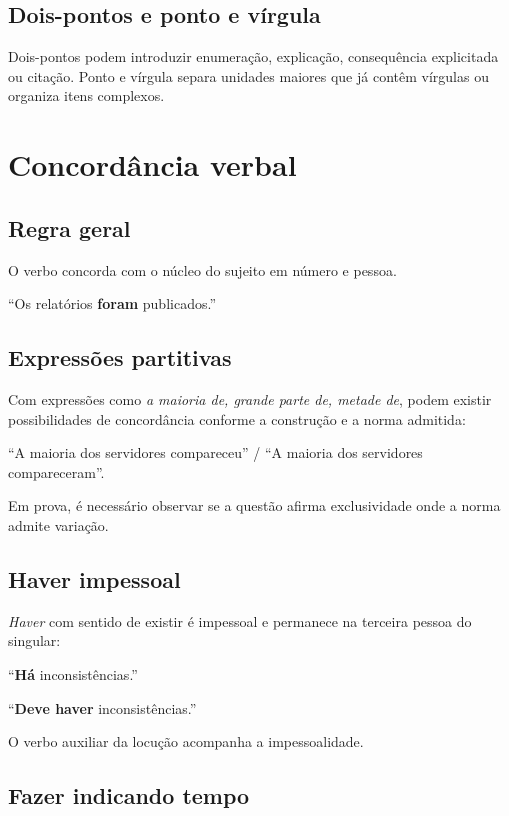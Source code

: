 \subsection{Dois-pontos e ponto e vírgula}

Dois-pontos podem introduzir enumeração, explicação, consequência explicitada ou citação. Ponto e vírgula separa unidades maiores que já contêm vírgulas ou organiza itens complexos.

\section{Concordância verbal}

\subsection{Regra geral}

O verbo concorda com o núcleo do sujeito em número e pessoa.

``Os relatórios \textbf{foram} publicados.''

\subsection{Expressões partitivas}

Com expressões como \emph{a maioria de, grande parte de, metade de}, podem existir possibilidades de concordância conforme a construção e a norma admitida:

``A maioria dos servidores compareceu'' / ``A maioria dos servidores compareceram''.

Em prova, é necessário observar se a questão afirma exclusividade onde a norma admite variação.

\subsection{Haver impessoal}

\emph{Haver} com sentido de existir é impessoal e permanece na terceira pessoa do singular:

``\textbf{Há} inconsistências.''

``\textbf{Deve haver} inconsistências.''

O verbo auxiliar da locução acompanha a impessoalidade.

\subsection{Fazer indicando tempo}

